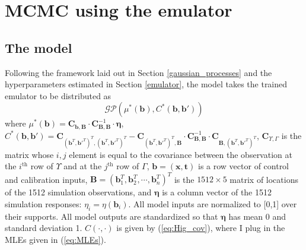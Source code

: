 \documentclass{article}
\begin{document}
\section{MCMC using the emulator}\label{MCMC}


\subsection{The model}
Following the framework laid out in Section \ref{gaussian_processes} and the hyperparameters estimated in Section \ref{emulator}, the model takes the trained emulator to be distributed as
\begin{equation}\label{posterior_GP}
\mathcal {GP}\left(\mu^*(\mathbf b), C^*(\mathbf b,\mathbf b')\right)
\end{equation}
where $\mu^*(\mathbf b) = \mathbf C_{\mathbf b,\mathbf B} \cdot \mathbf C_{\mathbf B,\mathbf B}^{-1} \cdot \boldsymbol \eta$, $C^*(\mathbf b,\mathbf b') = \mathbf C_{(\mathbf b^T,\mathbf b'^T)^T,(\mathbf b^T,\mathbf b'^T)^T} - \mathbf C_{(\mathbf b^T,\mathbf b'^T)^T,\mathbf B}\cdot \mathbf C_{\mathbf B,\mathbf B}^{-1} \cdot \mathbf C_{\mathbf B,(\mathbf b^T,\mathbf b'^T)^T}$, $\mathbf C_{\Upsilon,\Gamma}$ is the matrix whose $i,j$ element is equal to the covariance between the observation at the $i^{\text{th}}$ row of $\Upsilon$ and at the $j^{\text{th}}$ row of $\Gamma$, $\mathbf b=(\mathbf x,\mathbf t)$ is a row vector of control and calibration inputs, $\mathbf B=(\mathbf b_1^T,\mathbf b_2^T,\cdots,\mathbf b_n^T)^T$ is the $1512\times5$ matrix of locations of the 1512 simulation observations, and $\boldsymbol\eta$ is a column vector of the 1512 simulation responses: $\eta_i=\eta(\mathbf b_i)$. All model inputs are normalized to [0,1] over their supports. All model outputs are standardized so that $\boldsymbol\eta$ has mean 0 and standard deviation 1.
$C(\cdot,\cdot)$ is given by (\ref{eq:Hig_cov}), where I plug in the MLEs given in (\ref{eq:MLEs}). 
\end{document}
